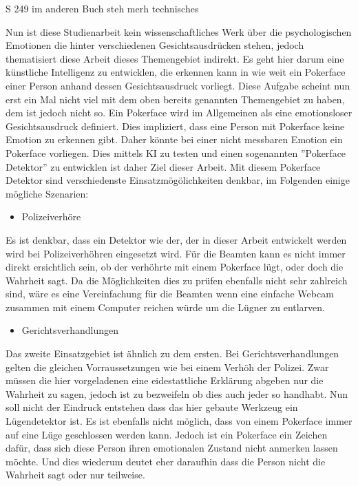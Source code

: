 \documentclass[12pt, a4paper]{scrbook}
\begin{document}
S 249 im anderen Buch steh merh technisches

Nun ist diese Studienarbeit kein wissenschaftliches Werk über die psychologischen Emotionen die hinter verschiedenen Gesichtsausdrücken stehen, jedoch thematisiert diese Arbeit dieses Themengebiet indirekt. Es geht hier darum eine künstliche Intelligenz zu entwicklen, die erkennen kann in wie weit ein Pokerface einer Person anhand dessen Gesichtsausdruck vorliegt. Diese Aufgabe scheint nun erst ein Mal nicht viel mit dem oben bereits genannten Themengebiet zu haben, dem ist jedoch nicht so. Ein Pokerface wird im Allgemeinen als eine emotionsloser Gesichtsausdruck definiert. Dies impliziert, dass eine Person mit Pokerface keine Emotion zu erkennen gibt. Daher könnte bei einer nicht messbaren Emotion ein Pokerface vorliegen. Dies mittels KI zu testen und einen sogenannten ''Pokerface Detektor'' zu entwicklen ist daher Ziel dieser Arbeit. Mit diesem Pokerface Detektor sind verschiedenste Einsatzmögölichkeiten denkbar, im Folgenden einige mögliche Szenarien:
\begin{itemize}
	\item{Polizeiverhöre}
\end{itemize}
Es ist denkbar, dass ein Detektor wie der, der in dieser Arbeit entwickelt werden wird bei Polizeiverhöhren eingesetzt wird. Für die Beamten kann es nicht immer direkt ersichtlich sein, ob der verhöhrte mit einem Pokerface lügt, oder doch die Wahrheit sagt. Da die Möglichkeiten dies zu prüfen ebenfalls nicht sehr zahlreich sind, wäre es eine Vereinfachung für die Beamten wenn eine einfache Webcam zusammen mit einem Computer reichen würde um die Lügner zu entlarven.
\begin{itemize}
	\item{Gerichtsverhandlungen}
\end{itemize}
Das zweite Einsatzgebiet ist ähnlich zu dem ersten. Bei Gerichtsverhandlungen gelten die gleichen Vorraussetzungen wie bei einem Verhöh der Polizei. Zwar müssen die hier vorgeladenen eine eidestattliche Erklärung abgeben nur die Wahrheit zu sagen, jedoch ist zu bezweifeln ob dies auch jeder so handhabt. 
Nun soll nicht der Eindruck entstehen dass das hier gebaute Werkzeug ein Lügendetektor ist. Es ist ebenfalls nicht möglich, dass von einem Pokerface immer auf eine Lüge geschlossen werden kann. Jedoch ist ein Pokerface ein Zeichen dafür, dass sich diese Person ihren emotionalen Zustand nicht anmerken lassen möchte. Und dies wiederum deutet eher daraufhin dass die Person nicht die Wahrheit sagt oder nur teilweise. 
\end{document}
